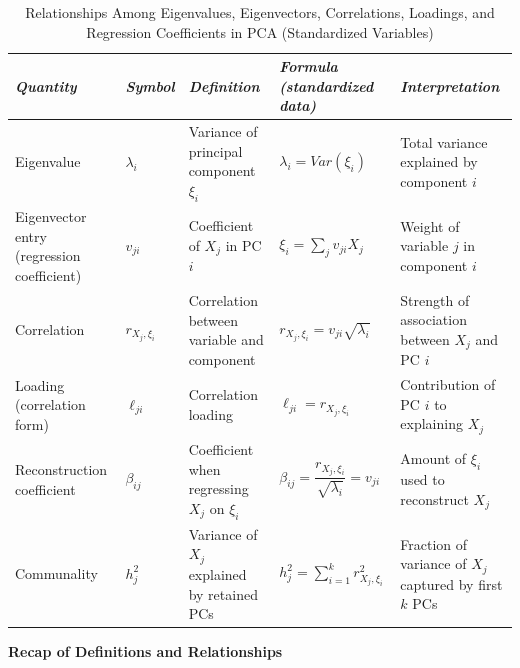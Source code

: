 \begin{table}[H]
\centering
\renewcommand{\arraystretch}{1.5}
\begin{tabularx}{0.95\textwidth}{
>{\raggedright\arraybackslash}p{2.6cm}
>{\raggedright\arraybackslash}p{1.2cm}
X X X}
\toprule
\textit{Quantity} 
& \textit{Symbol} 
& \textit{Definition} 
& \textit{Formula (standardized data)} 
& \textit{Interpretation} \\
\midrule

Eigenvalue 
& $\lambda_i$ 
& Variance of principal component $\xi_i$ 
& $\lambda_i = Var(\xi_i)$ 
& Total variance explained by component $i$ \\

Eigenvector entry 
(regression coefficient) 
& $v_{ji}$ 
& Coefficient of $X_j$ in PC $i$ 
& $\xi_i = \sum_j v_{ji} X_j$ 
& Weight of variable $j$ in component $i$ \\

Correlation 
& $r_{X_j,\xi_i}$ 
& Correlation between variable and component 
& $r_{X_j,\xi_i} = v_{ji}\sqrt{\lambda_i}$ 
& Strength of association between $X_j$ and PC $i$ \\

Loading 
(correlation form) 
& $\ell_{ji}$ 
& Correlation loading 
& $\ell_{ji} = r_{X_j,\xi_i}$ 
& Contribution of PC $i$ to explaining $X_j$ \\

Reconstruction coefficient 
& $\beta_{ij}$ 
& Coefficient when regressing $X_j$ on $\xi_i$ 
& $\beta_{ij} = \dfrac{r_{X_j,\xi_i}}{\sqrt{\lambda_i}} = v_{ji}$ 
& Amount of $\xi_i$ used to reconstruct $X_j$ \\

Communality 
& $h_j^2$ 
& Variance of $X_j$ explained by retained PCs 
& $h_j^2 = \sum_{i=1}^k r_{X_j,\xi_i}^2$ 
& Fraction of variance of $X_j$ captured by first $k$ PCs \\

\bottomrule
\end{tabularx}
\caption*{Relationships Among Eigenvalues, Eigenvectors, Correlations, Loadings, and Regression Coefficients in PCA (Standardized Variables)}
\end{table}

\noindent\textbf{Recap of Definitions and Relationships}


